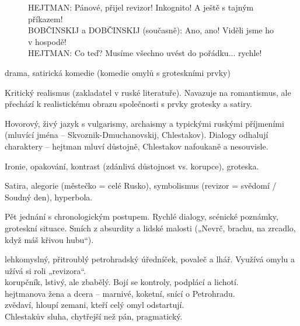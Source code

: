 \documentclass[FGBook.tex]{subfiles}
\begin{document}

\noindent\begin{figure}\footnotesize
{}
\setlength{\parindent}{3pt}
HEJTMAN: Pánové, přijel revizor! Inkognito! A ještě s tajným příkazem!\\
BOBČINSKIJ a DOBČINSKIJ (současně): Ano, ano! Viděli jsme ho v hospodě!\\
HEJTMAN: Co teď? Musíme všechno uvést do pořádku... rychle!
\end{figure}


\noindent drama, satirická komedie (komedie omylů s groteskními prvky)

\noindent Kritický realismus (zakladatel v ruské literatuře). Navazuje na romantismus, ale přechází k realistickému obrazu společnosti s prvky grotesky a satiry.

\noindent Hovorový, živý jazyk s vulgarismy, archaismy a typickými ruskými příjmeními (mluvící jména – Skvoznik-Dmuchanovskij, Chlestakov). Dialogy odhalují charaktery – hejtman mluví důstojně, Chlestakov nafoukaně a nesouvisle.

\noindent Ironie, opakování, kontrast (zdánlivá důstojnost vs. korupce), groteska.

\noindent Satira, alegorie (městečko = celé Rusko), symbolismus (revizor = svědomí / Soudný den), hyperbola.

\noindent Pět jednání s chronologickým postupem. Rychlé dialogy, scénické poznámky, groteskní situace. Smích z absurdity a lidské malosti („Nevrč, brachu, na zrcadlo, když máš křivou hubu“).

\noindent 
{} lehkomyslný, přitroublý petrohradský úředníček, povaleč a lhář. Využívá omylu a užívá si roli „revizora“.\\
 korupčník, lstivý, ale zbabělý. Bojí se kontroly, podplácí a lichotí.\\
 hejtmanova žena a dcera – marnivé, koketní, snící o Petrohradu.\\
 zvědaví, hloupí zemani, kteří celý omyl odstartují.\\
 Chlestakův sluha, chytřejší než pán, pragmatický.
\end{document}
